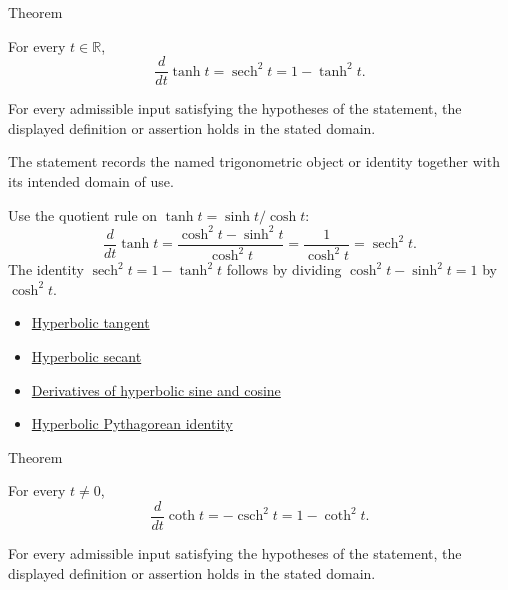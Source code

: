 \begin{theorembox}{Theorem}
\begin{theorem}
\label{thm:hyperbolic-tangent-derivative}
For every $t\in\mathbb{R}$,
\[
  \frac{d}{dt}\tanh t=\operatorname{sech}^2 t=1-\tanh^2 t.
\]
\end{theorem}
\end{theorembox}
\begin{remark*}
For every admissible input satisfying the hypotheses of the statement, the
displayed definition or assertion holds in the stated domain.
\end{remark*}

\begin{remark*}[Interpretation]
The statement records the named trigonometric object or identity together with
its intended domain of use.
\end{remark*}

\begin{remark*}[Proof]
Use the quotient rule on $\tanh t=\sinh t/\cosh t$:
\[
  \frac{d}{dt}\tanh t
  =
  \frac{\cosh^2 t-\sinh^2 t}{\cosh^2 t}
  =
  \frac{1}{\cosh^2 t}
  =
  \operatorname{sech}^2 t.
\]
The identity $\operatorname{sech}^2 t=1-\tanh^2 t$ follows by dividing
$\cosh^2 t-\sinh^2 t=1$ by $\cosh^2 t$.
\end{remark*}
\begin{dependencies}
\begin{itemize}
  \item \hyperref[def:hyperbolic-tangent]{Hyperbolic tangent}
  \item \hyperref[def:hyperbolic-secant]{Hyperbolic secant}
  \item \hyperref[thm:hyperbolic-sinh-cosh-derivatives]{Derivatives of hyperbolic sine and cosine}
  \item \hyperref[thm:hyperbolic-pythagorean-identity]{Hyperbolic Pythagorean identity}
\end{itemize}
\end{dependencies}

\begin{theorembox}{Theorem}
\begin{theorem}
\label{thm:hyperbolic-cotangent-derivative}
For every $t\neq 0$,
\[
  \frac{d}{dt}\operatorname{coth} t=-\operatorname{csch}^2 t
  =1-\operatorname{coth}^2 t.
\]
\end{theorem}
\end{theorembox}
\begin{remark*}
For every admissible input satisfying the hypotheses of the statement, the
displayed definition or assertion holds in the stated domain.
\end{remark*}

